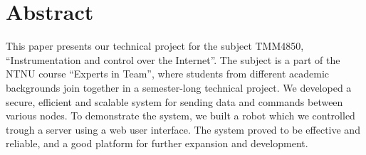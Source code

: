 \chapter{Abstract}
This paper presents our technical project for the subject TMM4850, ``Instrumentation and control over the Internet''.
The subject is a part of the NTNU course ``Experts in Team'', where students from different academic backgrounds join together in a semester-long technical project.
We developed a secure, efficient and scalable system for sending data and commands between various nodes. 
To demonstrate the system, we built a robot which we controlled trough a server using a web user interface.
The system proved to be effective and reliable, and a good platform for further expansion and development.

